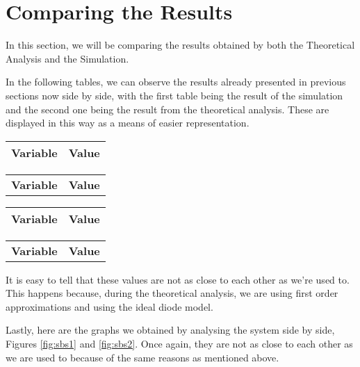 \clearpage

\section{Comparing the Results}
\label{sec:comparing}

In this section, we will be comparing the results obtained by both the Theoretical Analysis and the Simulation.

In the following tables, we can observe the results already presented in previous sections now side by side, with the first table being the result of the simulation and the second one being the result from the theoretical analysis. These are displayed in this
way as a means of easier representation.

\begin{table}[htb!]
  \begin{tabular}{|l|r|}
      \hline    
      {\bf Variable} & {\bf Value} \\ \hline
      
  \end{tabular}
\quad
  \begin{tabular}{|l|r|}
    \hline    
    {\bf Variable} & {\bf Value} \\ %
  \end{tabular}
\end{table}

\begin{table}[htb!]
  \begin{tabular}{|l|r|}
      \hline    
      {\bf Variable} & {\bf Value} \\ \hline
      
  \end{tabular}
\quad
  \begin{tabular}{|l|r|}
    \hline    
    {\bf Variable} & {\bf Value} \\ %
  \end{tabular}
\end{table}

It is easy to tell that these values are not as close to each other as we're used to. This happens because, during the theoretical analysis, we are using first order approximations and using the ideal diode model.

\clearpage

Lastly, here are the graphs we obtained by analysing the system side by side, Figures \ref{fig:sbs1} and \ref{fig:sbs2}. Once again, they are not as close to each other as we are used to because of the same reasons as mentioned above.

